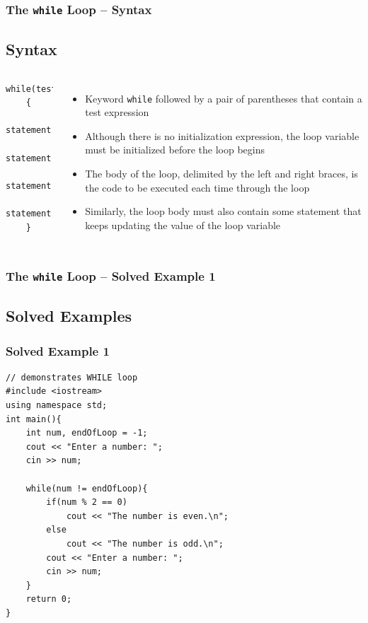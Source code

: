 \documentclass{beamer}
\begin{document}
\begin{frame}[fragile]
    \frametitle{The \texttt{while} Loop -- Syntax}
    \subsection{Syntax} %
    \label{sub:while_syntax}
    \begin{columns}
        \lstset{style=mystyle}
\begin{lstlisting}
while(test)
    {
       statement;
       statement;
       statement;
       statement;
    }
\end{lstlisting}
            \begin{itemize}
            \item Keyword \texttt{while} followed by a pair of parentheses that contain a test expression
            \item Although there is no initialization expression, the loop variable must be initialized before the loop begins
            \item The body of the loop, delimited by the left and right braces, is the code to be executed each time through the loop
            \item Similarly, the loop body must also contain some statement that keeps updating the value of the loop variable
            \end{itemize}
    \end{columns}
\end{frame}

\begin{frame} [fragile]
    \frametitle{The \texttt{while} Loop -- Solved Example 1}
    \subsection{Solved Examples} %
    \label{sub:while_solved_examples}
    \subsubsection{Solved Example 1} %
    \label{subsub:while_solved_example_1}
    \lstset{style=mystyle}
    \begin{lstlisting}
// demonstrates WHILE loop
#include <iostream>
using namespace std;
int main(){
    int num, endOfLoop = -1;
    cout << "Enter a number: ";
    cin >> num;
    
    while(num != endOfLoop){
        if(num % 2 == 0)
            cout << "The number is even.\n";
        else
            cout << "The number is odd.\n";
        cout << "Enter a number: ";
        cin >> num;
    }
    return 0;
}
\end{lstlisting}
\end{frame}
\end{document}
